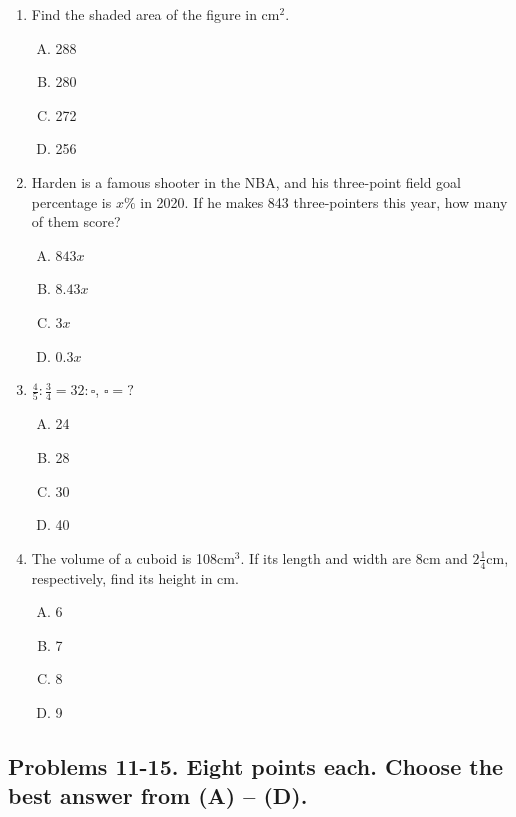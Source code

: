 \documentclass[12pt]{scrartcl}
\begin{document}
\begin{enumerate}
\item Find the shaded area of the figure in cm$^2$.
\begin{enumerate}[(A)]
    \item 288 \item 280 \item 272 \item 256
\end{enumerate}

\item Harden is a famous shooter in the NBA, and his three-point field goal percentage is $x\%$ in 2020. If he makes 843 three-pointers this year, how many of them score?
\begin{enumerate}[(A)]
    \item $843x$ \item $8.43x$ \item $3x$ \item $0.3x$
\end{enumerate}

\item $\frac{4}{5} : \frac{3}{4} = 32 : \square$, $\square = ?$
\begin{enumerate}[(A)]
    \item 24 \item 28 \item 30 \item 40
\end{enumerate}

\item The volume of a cuboid is 108cm$^3$. If its length and width are 8cm and $2\frac{1}{4}$cm, respectively, find its height in cm.
\begin{enumerate}[(A)]
    \item 6 \item 7 \item 8 \item 9
\end{enumerate}
\end{enumerate}

\subsection*{Problems 11-15. Eight points each. Choose the best answer from (A) -- (D).}
\end{document}
